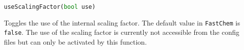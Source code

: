 \documentclass[numbers=noenddot]{aux/fcmanual}
\newcommand{\fc}{\texttt{FastChem}\xspace}
\begin{document}
\bigbreak

\lstinline[language=Python]!useScalingFactor(bool use)!
\begin{addmargin}[25pt]{0pt}
	Toggles the use of the internal scaling factor. The default value in \fc is \lstinline[language=Python]!false!. The use of the scaling factor is currently not accessible from the config files but can only be activated by this function.
\end{addmargin}





  
\end{document}

